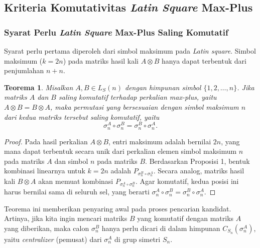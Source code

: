 \documentclass[journal]{IEEEtran}
\newtheorem{teo}[defn]{Teorema}
\theoremstyle{definition}
\theoremstyle{plain}
\begin{document}
\subsection{Kriteria Komutativitas \textit{Latin Square} Max-Plus}
\subsubsection{Syarat Perlu \textit{Latin Square} Max-Plus Saling Komutatif}
Syarat perlu pertama diperoleh dari simbol maksimum pada \textit{Latin square}. Simbol maksimum ($k=2n$) pada matriks hasil kali $A \otimes B$ hanya dapat terbentuk dari penjumlahan $n+n$.
\begin{teo}
    Misalkan $A,B\in L_S(n)$ dengan himpunan simbol $\{1,2,\ldots,n\}$.
    Jika matriks $A$ dan $B$ saling komutatif terhadap perkalian max-plus, yaitu $A\otimes B=B\otimes A$, maka permutasi yang bersesuaian dengan simbol maksimum $n$ dari kedua matriks tersebut saling komutatif, yaitu
    \begin{equation}
        \sigma_n^A\circ\sigma_n^B=\sigma_n^B\circ\sigma_n^A.
    \end{equation}
\end{teo}
\begin{proof}
    Pada hasil perkalian $A \otimes B$, entri maksimum adalah bernilai $2n$, yang mana dapat terbentuk secara unik dari perkalian elemen simbol maksimum $n$ pada matriks $A$ dan simbol $n$ pada matriks $B$. Berdasarkan Proposisi 1, bentuk kombinasi linearnya untuk $k=2n$ adalah $P_{\sigma_n^B \circ \sigma_n^A}$. Secara analog, matriks hasil kali $B \otimes A$ akan memuat kombinasi $P_{\sigma_n^A \circ \sigma_n^B}$. Agar komutatif, kedua posisi ini harus bernilai sama di seluruh sel, yang berarti $\sigma_n^A\circ\sigma_n^B=\sigma_n^B\circ\sigma_n^A$.
\end{proof}
Teorema ini memberikan penyaring awal pada proses pencarian kandidat. Artinya, jika kita ingin mencari matriks $B$ yang komutatif dengan matriks $A$ yang diberikan, maka calon $\sigma_n^B$ hanya perlu dicari di dalam himpunan $C_{S_n}(\sigma_n^A)$, yaitu \textit{centralizer} (pemusat) dari $\sigma_n^A$ di grup simetri $S_n$.
\end{document}
